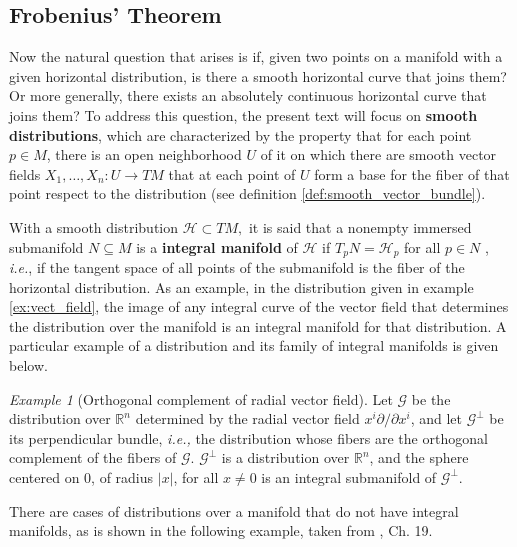 \documentclass[12pt, letterpaper, reqno]{amsart}
\theoremstyle{definition}
\theoremstyle{plain}
\theoremstyle{remark}
\newtheorem{ex}{Example}
\begin{document}
\subsection{Frobenius' Theorem}%
\label{sub:chow_s^theorem}


Now the natural question that arises is if, given two points on a manifold with a given horizontal distribution, is there a smooth horizontal curve that joins them? Or more generally, there exists an absolutely continuous horizontal curve that joins them? To address this question, the present text will focus on \textbf{smooth distributions}, which are characterized by the property that for each point $ p\in M $, there is an open neighborhood $ U $ of it on which there are smooth vector fields $ X_1,\dots,X_n: U \rightarrow {TM} $ that at each point of $ U $ form a base for the fiber of that point respect to the distribution (see definition \ref{def:smooth_vector_bundle}).

With a smooth distribution $ \mathcal{H} \subset TM, $ it is said that a nonempty immersed submanifold $ N\subseteq M $  is a \textbf{integral manifold} of $\mathcal{H}$ if $ T_p N = \mathcal{H}_p $ for all $ p\in N $ , \textit{i.e.}, if the tangent space of all points of the submanifold is the fiber of the horizontal distribution. As an example, in the distribution given in example \ref{ex:vect_field}, the image of any integral curve of the vector field that determines the distribution over the manifold is an integral manifold for that distribution. A particular example of a distribution and its family of integral manifolds is given below.

\begin{ex}[Orthogonal complement of radial vector field]
	Let $ \mathcal{G} $ be the distribution over $ \mathbb{R}^n $ determined by the radial vector field $ x^i \partial / \partial x^i $, and let $ \mathcal{G}^\perp $ be its perpendicular bundle, \textit{i.e.,} the distribution whose fibers are the orthogonal complement of the fibers of $ \mathcal{G}. $ $ \mathcal{G}^\perp $ is a distribution over $ \mathbb{R}^n  $, and the sphere centered on $0$, of radius $ |x| $, for all $ x\neq0 $ is an integral submanifold of $ \mathcal{G}^\perp. $        
\end{ex}

There are cases of distributions over a manifold that do not have integral manifolds, as is shown in the following example, taken from \cite{lee2003introduction}, Ch. 19.
\end{document}
